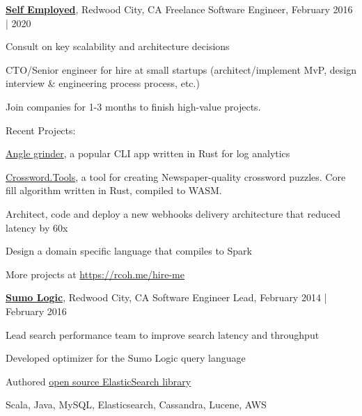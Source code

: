 \documentclass[10pt]{article}
\newenvironment{outerlist}[1][\enskip\textbullet]%
        {\begin{itemize}[#1]}{\end{itemize}%
         \vspace{-.6\baselineskip}}
\newenvironment{innerlist}[1][\enskip\textbullet]%
        {\begin{compactitem}[#1]}{\end{compactitem}}
\newcommand{\blankline}{\quad\pagebreak[2]}
\begin{document}
\href{http://rcoh.me}{\textbf{Self Employed}}, Redwood City, CA \hfill{Freelance Software Engineer, February 2016 | 2020}
 \begin{outerlist}
    \item[] \begin{innerlist}[-]
        \item Consult on key scalability and architecture decisions
	\item CTO/Senior engineer for hire at small startups (architect/implement MvP, design interview \& engineering process process, etc.)
        \item Join companies for 1-3 months to finish high-value projects.
        \item Recent Projects:
        \item[] \begin{innerlist}[+]
		\item \href{https://github.com/rcoh/angle-grinder}{Angle grinder}, a popular CLI app written in Rust for log analytics
		\item \href{https://crossword.tools}{Crossword.Tools}, a tool for creating Newspaper-quality crossword puzzles. Core fill algorithm written in Rust, compiled to WASM.
                \item Architect, code and deploy a new webhooks delivery architecture that reduced latency by 60x
                \item Design a domain specific language that compiles to Spark
                \item More projects at \href{https://rcoh.me/hire-me}{https://rcoh.me/hire-me}
	\end{innerlist}
    \end{innerlist}
\end{outerlist}

\blankline

\href{http://www.sumologic.com/}{\textbf{Sumo Logic}}, Redwood City, CA \hfill{Software Engineer Lead, February 2014  | February 2016}
 \begin{outerlist}
	\item[] \begin{innerlist}[-]
		\item Lead search performance team to improve search latency and throughput
		\item Developed optimizer for the Sumo Logic query language
          	\item Authored \href{https://github.com/SumoLogic/elasticsearch-client}{open source ElasticSearch library}
		\item Scala, Java, MySQL, Elasticsearch, Cassandra, Lucene, AWS
	    \end{innerlist}
\end{outerlist}
\end{document}
